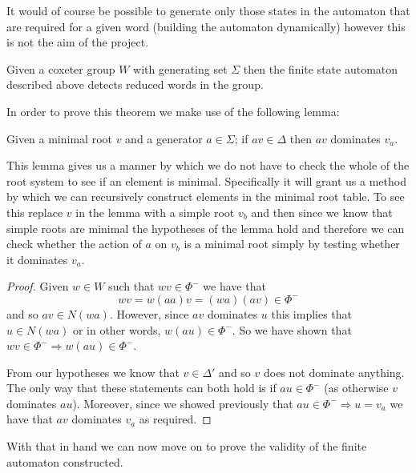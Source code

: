 \documentclass[a4paper,12pt]{article}
\begin{document}
It would of course be possible to generate only those states in the automaton that are required for a given word (building the automaton dynamically) however this is not the aim of the project.

\begin{thm}
	Given a coxeter group $W$ with generating set $\Sigma$ then the finite state automaton described above detects reduced words in the group.
\end{thm}

In order to prove this theorem we make use of the following lemma:

\begin{lem}
	Given a minimal root $v$ and a generator $a \in \Sigma$; if $av \in \Delta$ then $av$ dominates $v_a$.
\end{lem}

This lemma gives us a manner by which we do not have to check the whole of the root system to see if an element is minimal. Specifically it will grant us a method by which we can recursively construct elements in the minimal root table. To see this replace $v$ in the lemma with a simple root $v_b$ and then since we know that simple roots are minimal the hypotheses of the lemma hold and therefore we can check whether the action of $a$ on $v_b$ is a minimal root simply by testing whether it dominates $v_a$.

\begin{proof}
Given $w \in W$ such that $wv \in \Phi^-$ we have that 
\[wv = w(aa)v = (wa)(av) \in \Phi^-\] 
and so $av \in N(wa)$. However, since $av$ dominates $u$ this implies that $u \in N(wa)$ or in other words, $w(au) \in \Phi^-$. So we have shown that $wv \in \Phi^- \Rightarrow w(au) \in \Phi^-$.

From our hypotheses we know that $v \in \Delta'$ and so $v$ does not dominate anything. The only way that these statements can both hold is if $au \in \Phi^-$ (as otherwise $v$ dominates $au$). Moreover, since we showed previously that $au \in \Phi^- \Rightarrow u = v_a$ we have that $av$ dominates $v_a$ as required.
\end{proof}

With that in hand we can now move on to prove the validity of the finite automaton constructed.
\end{document}
